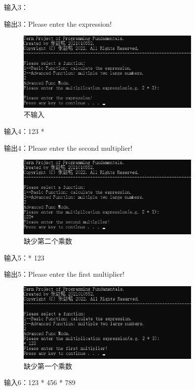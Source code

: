 \documentclass[a4paper, 11pt, UTF8]{ctexart}
\begin{document}
输入3：

输出3：Please enter the expression!

\begin{figure}[H]
    \centering
    \caption{不输入}
    \includegraphics[width=0.8\textwidth]{t3.png}    
\end{figure}

输入4：123 *

输出4：Please enter the second multiplier!

\begin{figure}[H]
    \centering
    \caption{缺少第二个乘数}
    \includegraphics[width=0.8\textwidth]{t4.png}    
\end{figure}

输入5：* 123

输出5：Please enter the first multiplier!

\begin{figure}[H]
    \centering
    \caption{缺少第一个乘数}
    \includegraphics[width=0.8\textwidth]{t5.png}    
\end{figure}

输入6：123 * 456 * 789
\end{document}
